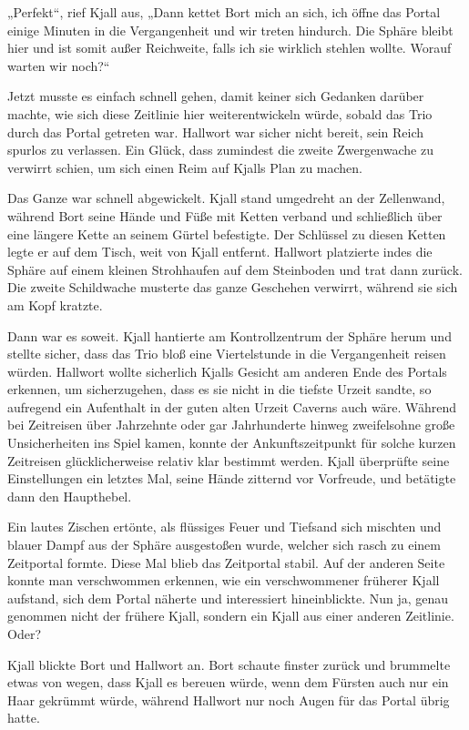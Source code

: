 „Perfekt“, rief Kjall aus, „Dann kettet Bort mich an sich, ich öffne das Portal einige Minuten in die Vergangenheit und wir treten hindurch. Die Sphäre bleibt hier und ist somit außer Reichweite, falls ich sie wirklich stehlen wollte. Worauf warten wir noch?“

Jetzt musste es einfach schnell gehen, damit keiner sich Gedanken darüber machte, wie sich diese Zeitlinie hier weiterentwickeln würde, sobald das Trio durch das Portal getreten war. Hallwort war sicher nicht bereit, sein Reich spurlos zu verlassen. Ein Glück, dass zumindest die zweite Zwergenwache zu verwirrt schien, um sich einen Reim auf Kjalls Plan zu machen.

Das Ganze war schnell abgewickelt. Kjall stand umgedreht an der Zellenwand, während Bort seine Hände und Füße mit Ketten verband und schließlich über eine längere Kette an seinem Gürtel befestigte. Der Schlüssel zu diesen Ketten legte er auf dem Tisch, weit von Kjall entfernt. Hallwort platzierte indes die Sphäre auf einem kleinen Strohhaufen auf dem Steinboden und trat dann zurück. Die zweite Schildwache musterte das ganze Geschehen verwirrt, während sie sich am Kopf kratzte.

Dann war es soweit. Kjall hantierte am Kontrollzentrum der Sphäre herum und stellte sicher, dass das Trio bloß eine Viertelstunde in die Vergangenheit reisen würden. Hallwort wollte sicherlich Kjalls Gesicht am anderen Ende des Portals erkennen, um sicherzugehen, dass es sie nicht in die tiefste Urzeit sandte, so aufregend ein Aufenthalt in der guten alten Urzeit Caverns auch wäre. Während bei Zeitreisen über Jahrzehnte oder gar Jahrhunderte hinweg zweifelsohne große Unsicherheiten ins Spiel kamen, konnte der Ankunftszeitpunkt für solche kurzen Zeitreisen glücklicherweise relativ klar bestimmt werden. Kjall überprüfte seine Einstellungen ein letztes Mal, seine Hände zitternd vor Vorfreude, und betätigte dann den Haupthebel.

Ein lautes Zischen ertönte, als flüssiges Feuer und Tiefsand sich mischten und blauer Dampf aus der Sphäre ausgestoßen wurde, welcher sich rasch zu einem Zeitportal formte. Diese Mal blieb das Zeitportal stabil. Auf der anderen Seite konnte man verschwommen erkennen, wie ein verschwommener früherer Kjall aufstand, sich dem Portal näherte und interessiert hineinblickte. Nun ja, genau genommen nicht der frühere Kjall, sondern ein Kjall aus einer anderen Zeitlinie. Oder?

Kjall blickte Bort und Hallwort an. Bort schaute finster zurück und brummelte etwas von wegen, dass Kjall es bereuen würde, wenn dem Fürsten auch nur ein Haar gekrümmt würde, während Hallwort nur noch Augen für das Portal übrig hatte.

